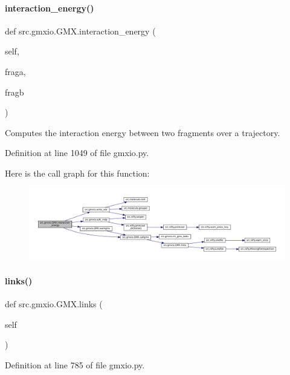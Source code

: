 \paragraph{\texorpdfstring{interaction\+\_\+energy()}{interaction\_energy()}}
{\footnotesize\ttfamily def src.\+gmxio.\+G\+M\+X.\+interaction\+\_\+energy (\begin{DoxyParamCaption}\item[{}]{self,  }\item[{}]{fraga,  }\item[{}]{fragb }\end{DoxyParamCaption})}



Computes the interaction energy between two fragments over a trajectory. 



Definition at line 1049 of file gmxio.\+py.

Here is the call graph for this function\+:
\nopagebreak
\begin{figure}[H]
\begin{center}
\leavevmode
\includegraphics[width=350pt]{classsrc_1_1gmxio_1_1GMX_a1374e65cac6409dfde7e90b110f4c599_cgraph}
\end{center}
\end{figure}
\mbox{\label{classsrc_1_1gmxio_1_1GMX_a3f0267ba817464cc778e6fe4a50e8440}} 
\paragraph{\texorpdfstring{links()}{links()}}
{\footnotesize\ttfamily def src.\+gmxio.\+G\+M\+X.\+links (\begin{DoxyParamCaption}\item[{}]{self }\end{DoxyParamCaption})}



Definition at line 785 of file gmxio.\+py.

